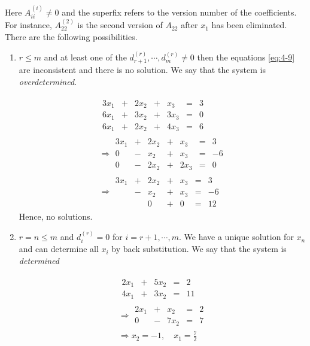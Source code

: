 \documentclass{article}
\numberwithin{equation}{section}
\begin{document}
Here $A^{(i)}_{ii} \neq 0$ and the superfix refers to the version number of the coefficients. 
For instance, $A^{(2)}_{22}$ is the second version of $A_{22}$ after $x_1$ has been eliminated.
There are the following possibilities.
\begin{enumerate}
    \item $r \leq m$ and at least one of the $d^{(r)}_{r + 1}, \cdots, d^{(r)}_{m} \neq 0$ then the equations \eqref{eq:4-9} are inconsistent and there is no solution.
    We say that the system is \emph{overdetermined}.
    \begin{eg}
        \begin{align*}
            \begin{array}{ccccccc}
                3x_1 & + & 2x_2 & + & x_3 & = & 3 \\
                6x_1 & + & 3x_2 & + & 3x_3 & = & 0 \\
                6x_1 & + & 2x_2 & + & 4x_3 & = & 6 
            \end{array}\\[15pt]
            \Rightarrow \begin{array}{ccccccc}
                3x_1 & + & 2x_2 & + & x_3 & = & 3 \\
                0    & - &  x_2 & + & x_3 & = & -6 \\
                0    & - & 2x_2 & + & 2x_3 & = & 0 
            \end{array}\\[15pt]
            \Rightarrow \begin{array}{ccccccc}
                3x_1 & + & 2x_2 & + & x_3 & = & 3 \\
                     & - &  x_2 & + & x_3 & = & -6 \\
                     &   & 0    & + & 0   & = & 12  
            \end{array}
        \end{align*}
        Hence, no solutions.
    \end{eg}

    \item $r = n \leq m$ and $d^{(r)}_{i} = 0$ for $i = r + 1, \cdots, m$. 
    We have a unique solution for $x_n$ and can determine all $x_i$ by back substitution.
    We say that the system is \emph{determined}
    \begin{eg}
        \begin{align*}
            \begin{array}{ccccc}
                2x_1 & + & 5x_2 & = & 2 \\
                4x_1 & + & 3x_2 & = & 11
            \end{array}\\[15pt]
            \Rightarrow \begin{array}{ccccc}
                2x_1 & + & x_2 & = & 2 \\
                0    & - & 7x_2 & = & 7
            \end{array}\\[15pt]
            \Rightarrow x_2 = -1, \quad x_1 = \frac{7}{2}
        \end{align*}
    \end{eg}


\end{enumerate}
\end{document}
